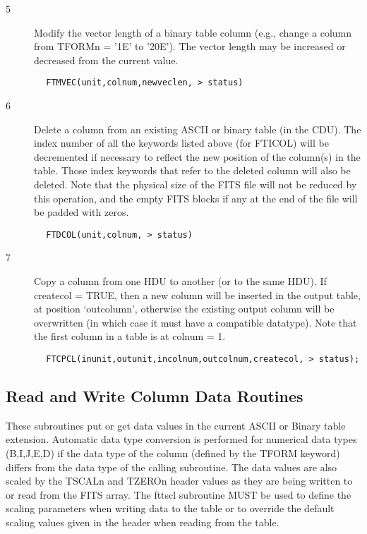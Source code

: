 \documentclass[11pt]{book}
\begin{document}
\begin{description}
\item[5 ] Modify the vector length of a binary table column (e.g.,
    change a column from TFORMn = '1E' to '20E').  The vector
   length may be increased or decreased from the current value.
\end{description}

\begin{verbatim}
        FTMVEC(unit,colnum,newveclen, > status)
\end{verbatim}

\begin{description}
\item[6 ] Delete a column from an existing ASCII or binary table (in the CDU).
    The index number of all the keywords listed above (for FTICOL) will be
    decremented if necessary to reflect the new position of the column(s) in
    the table.  Those index keywords that refer to the deleted column will
    also be deleted.  Note that the physical size of the FITS file will
    not be reduced by this operation, and the empty FITS blocks if any
   at the end of the file will be padded with zeros.
\end{description}

\begin{verbatim}
        FTDCOL(unit,colnum, > status)
\end{verbatim}

\begin{description}
\item[7 ] Copy a column from one HDU to another (or to the same HDU).  If
    createcol = TRUE, then a new column will be inserted in the output
    table, at position `outcolumn', otherwise the existing output column will
    be overwritten (in which case it must have a compatible datatype).
   Note that the first column in a table is at colnum = 1.
\end{description}

\begin{verbatim}
        FTCPCL(inunit,outunit,incolnum,outcolnum,createcol, > status);
\end{verbatim}

\subsection{Read and Write Column Data Routines \label{FTPCLS}}

These subroutines put or get data values in the current ASCII or Binary table
extension.  Automatic data type conversion is performed for numerical data
types (B,I,J,E,D) if the data type of the column (defined by the TFORM keyword)
differs from the data type of the calling subroutine.  The data values are also
scaled by the TSCALn and TZEROn header values as they are being written to
or read from the FITS array.  The fttscl subroutine MUST be used to define the
scaling parameters when writing data to the table or to override the default
scaling values given in the header
when reading from the table.
\end{document}
